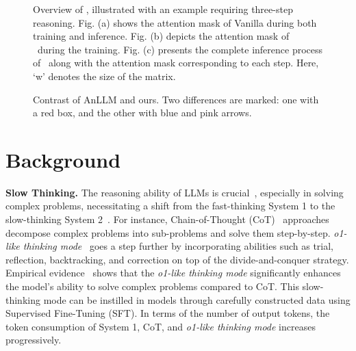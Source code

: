 

\begin{figure*}[t]
    \centering
    \begin{minipage}[t]{0.73\textwidth}
        \vspace{0pt}
        \caption{
        Overview of \ours, illustrated with an example requiring three-step reasoning.
        Fig. (a) shows the attention mask of Vanilla during both training and inference.
        Fig. (b) depicts the attention mask of \ours~during the training.
        Fig. (c) presents the complete inference process of \ours~along with the attention mask corresponding to each step. 
        Here, `w' denotes the size of the matrix.}
        \label{fig:method}
    \end{minipage}
    \hfill
    \begin{minipage}[t]{0.24\textwidth}
        \vspace{0pt}
        \caption{
        Contrast of AnLLM and ours.
        Two differences are marked: one with a red box, and the other with blue and pink arrows.
        }
        \label{fig:comp}
    \end{minipage}
\end{figure*}


\section{Background}

\textbf{Slow Thinking.}
The reasoning ability of LLMs is crucial~\citep{acl23_reason_survey}, especially in solving complex problems, necessitating a shift from the fast-thinking System 1 to the slow-thinking System 2~\citep{pb96_system12,fsg11_thinking_fast_slow,aaai21_machine_fast_slow}. 
For instance, Chain-of-Thought (CoT)~\citep{nips22_cot} approaches decompose complex problems into sub-problems and solve them step-by-step. 
\textit{o1-like thinking mode}~\citep{arixv24_o1,arxiv24_qwq,arxiv25_deepseek_r1} goes a step further by incorporating abilities such as trial, reflection, backtracking, and correction on top of the divide-and-conquer strategy. 
Empirical evidence~\citep{arixv24_o1,arxiv25_deepseek_r1} shows that the \textit{o1-like thinking mode} significantly enhances the model's ability to solve complex problems compared to CoT. 
This slow-thinking mode can be instilled in models through carefully constructed data using Supervised Fine-Tuning (SFT). 
In terms of the number of output tokens, the token consumption of System 1, CoT, and \textit{o1-like thinking mode} increases progressively.

